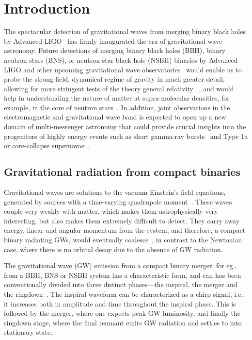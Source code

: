 \chapter{Introduction}

The spectacular detection of gravitational waves from merging binary black
holes by Advanced LIGO~\cite{Event_0, Event_2} has firmly inaugurated the era
of gravitational wave astronomy. Future detections of merging binary black
holes (BBH), binary neutron stars (BNS), or neutron star-black hole (NSBH)
binaries by Advanced LIGO and other upcoming  gravitational wave
observatories~\cite{KAGRA, Virgo, LIGO_india} would enable us to probe the
strong-field, dynamical regime of gravity in much greater detail, allowing for
more stringent tests of the theory general relativity ~\cite{Berti2015}, and
would help in understanding the nature of matter at supra-molecular densities,
for example, in the core of neutron stars~\cite{Agathos,Chatziioannou}. In
addition, joint observations in the electromagnetic and gravitational wave band
is expected to open up a new domain of multi-messenger astronomy that could
provide crucial insights into the progenitors of highly energy events such as
short gamma-ray bursts~\cite{Arun2014} and Type 1a or core-collapse
supernovae~\cite{Falta2011,Ott2013}.

\section{Gravitational radiation from compact binaries}

Gravitational waves are solutions to the vacuum Einstein's field equations,
generated by sources with a time-varying quadrupole moment~\cite{Creighton}.
These waves couple very weakly with matter, which makes them astrophysically
very interesting, but also makes them extremely difficult to detect. They
carry away energy, linear and angular momentum from the system, and therefore,
a compact binary radiating GWs, would eventually
coalesce~\cite{Peters1963}, in contrast to the Newtonian case, where there is
no orbital decay due to the absence of GW radiation.

The gravitational wave (GW) emission from a compact binary merger, for eg.,
from a BBH, BNS or NSBH system has a characteristic form, and can has been
conventionally divided into three distinct phases---the inspiral, the merger
and the ringdown~\cite{Event_0}. The inspiral waveform can be characterized as
a chirp signal, i.e., it increases both in amplitude and time throughout the
inspiral phase. This is followed by the merger, where one expects peak GW
luminosity, and finally the ringdown stage, where the final remnant emits GW
radiation and settles to into stationary state.

